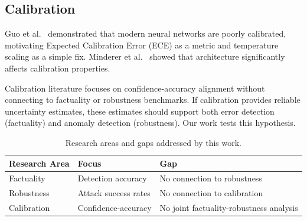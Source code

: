 \subsection{Calibration}

Guo et al.\ \cite{guo2017calibration} demonstrated that modern neural networks are poorly calibrated, motivating Expected Calibration Error (ECE) as a metric and temperature scaling as a simple fix. Minderer et al.\ \cite{minderer2021revisiting} showed that architecture significantly affects calibration properties.

Calibration literature focuses on confidence-accuracy alignment without connecting to factuality or robustness benchmarks. If calibration provides reliable uncertainty estimates, these estimates should support both error detection (factuality) and anomaly detection (robustness). Our work tests this hypothesis.

\begin{table}[t]
\centering
\caption{Research areas and gaps addressed by this work.}
\label{tab:gaps}
\begin{tabular}{@{}lll@{}}
\toprule
Research Area & Focus & Gap \\
\midrule
Factuality & Detection accuracy & No connection to robustness \\
Robustness & Attack success rates & No connection to calibration \\
Calibration & Confidence-accuracy & No joint factuality-robustness analysis \\
\bottomrule
\end{tabular}
\end{table}
